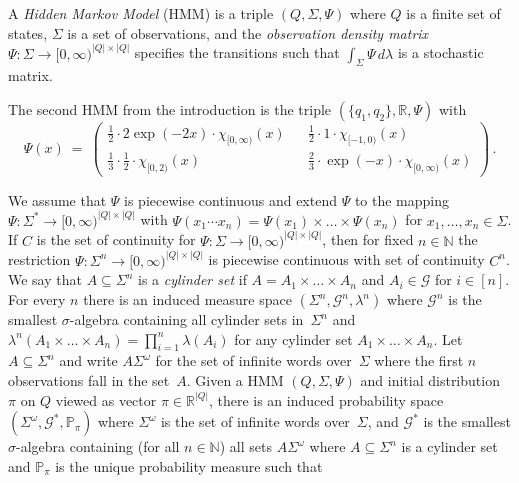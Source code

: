 \documentclass[a4paper,UKenglish,cleveref, autoref,mathscr, amsthm, thmtools, thm-restate]{lipics-v2019}
\newcommand{\RR}{\mathbb{R}}
\newcommand{\NN}{\mathbb{N}}
\newcommand{\PP}{\mathbb{P}}
\newcommand{\GG}{\mathscr{G}}
\newcommand{\1}{\mathbb{I}}
\begin{document}
\begin{definition}\label{HMMdef}
A \emph{Hidden Markov Model} (HMM) is a triple $(Q, \Sigma, \Psi)$ where $Q$ is a finite set of states, $\Sigma$ is a set of observations, and the \emph{observation density matrix} $\Psi : \Sigma \rightarrow [0,\infty)^{|Q| \times |Q|}$ specifies the transitions such that $\int_\Sigma \Psi\, d\lambda$ is a stochastic matrix.
\end{definition}
\begin{example} \label{ex-HMMdef}
The second HMM from the introduction is the triple $(\{q_1, q_2\}, \mathbb{R}, \Psi)$ with
\begin{equation}
\Psi(x) \ = \ \begin{pmatrix}
\frac12 \cdot 2 \exp(-2 x) \cdot \chi_{[0,\infty)}(x) && \frac12 \cdot 1 \cdot \chi_{[-1,0)}(x) \\
\frac13 \cdot \frac12 \cdot \chi_{[0,2)}(x) && \frac23 \cdot \exp(-x) \cdot \chi_{[0,\infty)}(x)
\end{pmatrix}\,. \tag*{\qed}
\end{equation}
\end{example}
We assume that $\Psi$ is piecewise continuous and extend $\Psi$ to the mapping $\Psi : \Sigma^* \rightarrow [0,\infty)^{|Q| \times |Q|}$ with $\Psi(x_1 \cdots x_n) = \Psi(x_1) \times \dots \times \Psi(x_n)$ for $x_1, \dots, x_n \in \Sigma$. If $C$ is the set of continuity for $\Psi : \Sigma \rightarrow [0,\infty)^{|Q| \times |Q|}$, then for fixed $n \in \NN$ the restriction $\Psi : \Sigma^n \rightarrow [0,\infty)^{|Q| \times |Q|}$ is piecewise continuous with set of continuity $C^n$. We say that $A \subseteq \Sigma^n$ is a \emph{cylinder set} if $A = A_1 \times \dots \times A_n$ and $A_i \in \GG$ for $i \in [n]$. For every $n$ there is an induced measure space $(\Sigma^n, \GG^n, \lambda^n)$ where $\GG^n$ is the smallest $\sigma$-algebra containing all cylinder sets in~$\Sigma^n$ and $\lambda^n(A_1 \times \dots \times A_n) = \prod_{i = 1}^n \lambda(A_i)$ for any cylinder set $A_1 \times \dots \times A_n$. Let $A \subseteq \Sigma^n$ and write $A \Sigma^\omega$ for the set of infinite words over~$\Sigma$ where the first $n$ observations fall in the set~$A$. Given a HMM $(Q, \Sigma, \Psi)$ and initial distribution $\pi$ on $Q$ viewed as vector $\pi \in \RR^{|Q|}$, there is an induced probability space $(\Sigma^\omega, \GG^*, \PP_\pi)$ where $\Sigma^\omega$ is the set of infinite words over~$\Sigma$, and $\GG^*$ is the smallest $\sigma$-algebra containing (for all $n \in \NN$) all sets $A \Sigma^\omega$ where $A\subseteq \Sigma^n$ is a cylinder set and $\PP_\pi$ is the unique probability measure such that
\end{document}
